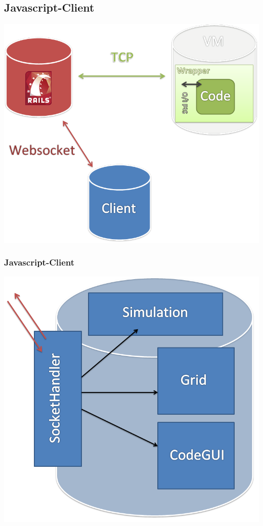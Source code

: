 \subsection{Javascript-Client}

\begin{frame}
\begin{center}
	\includegraphics[scale=0.35]{overview}
\end{center}
\end{frame}

\begin{frame}
\frametitle{Javascript-Client}
\begin{center}
	\includegraphics[scale=0.3]{client/modules.png}
\end{center}
\end{frame}

